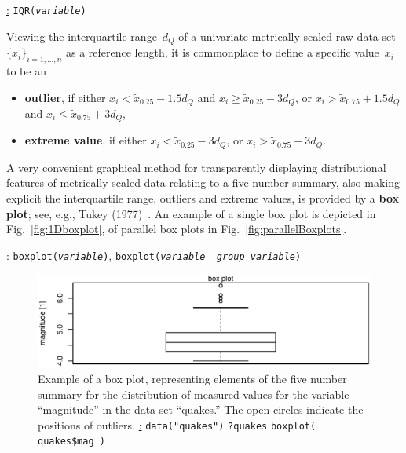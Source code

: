 \medskip
\noindent
\underline{\R:} \texttt{IQR(\textit{variable})}

\medskip
\noindent
Viewing the interquartile range~$d_{Q}$ of a univariate metrically
scaled raw data set~$\{x_{i}\}_{i=1,\ldots,n}$ as a reference
length, it is commonplace to define a specific value~$x_{i}$ to be
an
%
\begin{itemize}

\item \textbf{outlier}, if either $x_{i} < \tilde{x}_{0.25}
- 1.5d_{Q}$ and $x_{i} \geq \tilde{x}_{0.25}
- 3d_{Q}$, or $x_{i} > \tilde{x}_{0.75} + 1.5d_{Q}$ and
$x_{i} \leq \tilde{x}_{0.75} + 3d_{Q}$,

\item \textbf{extreme value}, if either $x_{i} < \tilde{x}_{0.25}
- 3d_{Q}$, or $x_{i} > \tilde{x}_{0.75} + 3d_{Q}$.

\end{itemize}
%

\medskip
\noindent
A very convenient graphical method for transparently displaying 
distributional features of metrically scaled data relating to a 
five number summary, also making explicit the interquartile
range, outliers and extreme values, is provided by a \textbf{box
plot}; see, e.g., Tukey (1977)~. An example of a single
box plot is depicted in Fig.~\ref{fig:1Dboxplot}, of parallel
box plots in Fig.~\ref{fig:parallelBoxplots}.

\medskip
\noindent
\underline{\R:} \texttt{boxplot(\textit{variable})},
\texttt{boxplot(\textit{variable}~\texttildelow~\textit{group
variable})}

%
\begin{figure}[!htb]
\begin{center}
\includegraphics[scale=0.8]{1Dboxplot.eps}
\end{center}
\caption{Example of a box plot, representing elements of the five
number summary for the distribution of measured values for the
variable ``magnitude'' in the \R{} data set ``quakes.'' The open
circles indicate the positions of outliers. \newline
\underline{\R:} \newline
\texttt{data("quakes")} \newline
\texttt{?quakes} \newline
\texttt{boxplot( quakes\$mag )}}
\end{figure}
%

